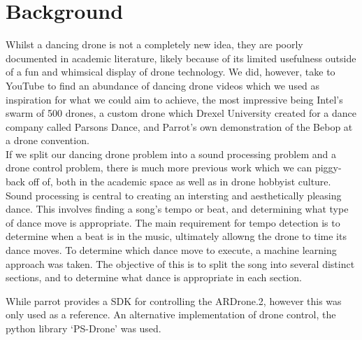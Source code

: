 \section{Background}

Whilst a dancing drone is not a completely new idea, they are poorly documented in academic literature, likely because of its limited usefulness outside of a fun and whimsical display of drone technology. We did, however, take to YouTube to find an abundance of dancing drone videos which we used as inspiration for what we could aim to achieve, the most impressive being Intel's swarm of 500 drones, a custom drone which Drexel University created for a dance company called Parsons Dance, and Parrot's own demonstration of the Bebop at a drone convention.\\


If we split our dancing drone problem into a sound processing problem and a drone control problem, there is much more previous work which we can piggy-back off of, both in the academic space as well as in drone hobbyist culture.\\

Sound processing is central to creating an intersting and aesthetically pleasing dance. This involves finding a song's tempo or beat, and determining what type of dance move is appropriate. The main requirement for tempo detection is to determine when a beat is in the music, ultimately allowng the drone to time its dance moves. To determine which dance move to execute, a machine learning approach was taken. The objective of this is to split the song into several distinct sections, and to determine what dance is appropriate in each section. 



While parrot provides a SDK for controlling the ARDrone.2, however this was only used as a reference. An alternative
implementation of drone control, the python library `PS-Drone' was used.
